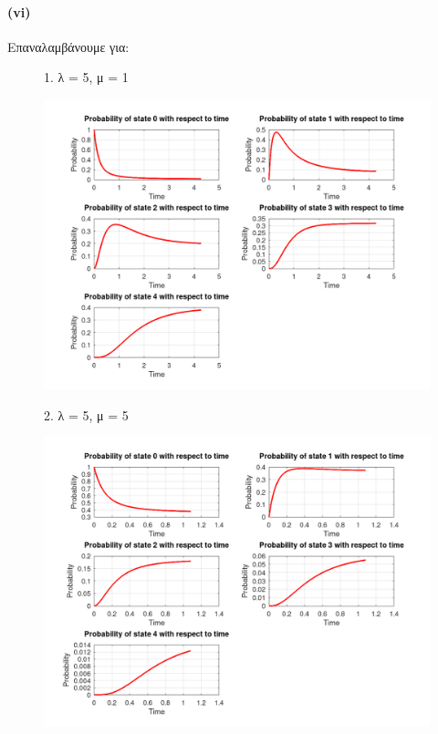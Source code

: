 \documentclass[a4paper]{article}
\begin{document}
\begin{minipage}{\textwidth}
\paragraph{(vi)}

Επαναλαμβάνουμε για:

	
	\begin{figure}[H]
		1. λ = 5, μ = 1 
		\begin{center}	
			\includegraphics[width=\textwidth]{files/3bvi_1.png}
		\end{center}
	\end{figure}

	
	\begin{figure}[H]
	2. λ = 5, μ = 5
		\begin{center}
			\includegraphics[width=\textwidth]{files/3bvi_2.png}
		\end{center}
	\end{figure}
\end{minipage}
	
\end{document}
